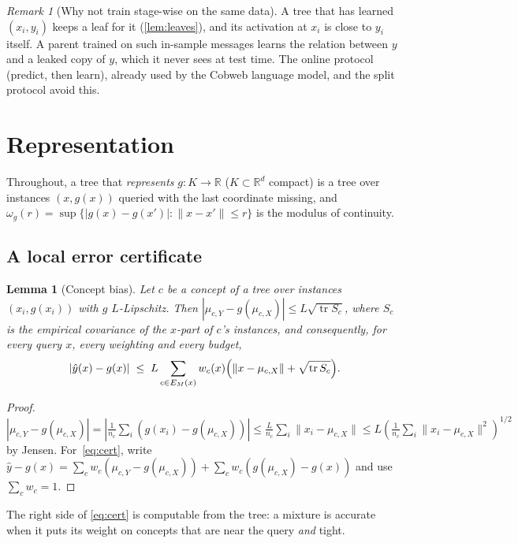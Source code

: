 \documentclass[11pt]{article}
\newtheorem{lemma}[theorem]{Lemma}
\theoremstyle{definition}
\theoremstyle{remark}
\newtheorem{remark}[theorem]{Remark}
\newcommand{\R}{\mathbb{R}}
\newcommand{\hy}{\hat{y}}
\newcommand{\tr}{\operatorname{tr}}
\begin{document}
\begin{remark}[Why not train stage-wise on the same data]
A tree that has learned $(x_i,y_i)$ keeps a leaf for it (\cref{lem:leaves}), and its
activation at $x_i$ is close to $y_i$ itself.  A parent trained on such in-sample
messages learns the relation between $y$ and a leaked copy of $y$, which it never sees at
test time.  The online protocol (predict, then learn), already used by the Cobweb
language model, and the split protocol avoid this.
\end{remark}

\section{Representation}\label{sec:repr}

Throughout, a tree that \emph{represents} $g:K\to\R$ ($K\subset\R^d$ compact) is a tree
over instances $(x,g(x))$ queried with the last coordinate missing, and
$\omega_g(r)=\sup\{|g(x)-g(x')|:\|x-x'\|\le r\}$ is the modulus of continuity.

\subsection{A local error certificate}

\begin{lemma}[Concept bias]\label{lem:bias}
Let $c$ be a concept of a tree over instances $(x_i,g(x_i))$ with $g$ $L$-Lipschitz.
Then $|\mu_{c,Y}-g(\mu_{c,X})|\le L\sqrt{\tr S_c}$, where $S_c$ is the empirical
covariance of the $x$-part of $c$'s instances, and consequently, for every query $x$,
every weighting and every budget,
\begin{equation}\label{eq:cert}
  |\hy(x)-g(x)|\;\le\;L\sum_{c\in E_M(x)}w_c(x)\Bigl(\|x-\mu_{c,X}\|+\sqrt{\tr S_c}\Bigr).
\end{equation}
\end{lemma}
\begin{proof}
$|\mu_{c,Y}-g(\mu_{c,X})|=|\tfrac{1}{n_c}\sum_i(g(x_i)-g(\mu_{c,X}))|\le
\tfrac{L}{n_c}\sum_i\|x_i-\mu_{c,X}\|\le L(\tfrac1{n_c}\sum_i\|x_i-\mu_{c,X}\|^2)^{1/2}$
by Jensen.  For~\eqref{eq:cert}, write $\hy-g(x)=\sum_c w_c(\mu_{c,Y}-g(\mu_{c,X}))+
\sum_c w_c(g(\mu_{c,X})-g(x))$ and use $\sum_cw_c=1$.
\end{proof}

The right side of \eqref{eq:cert} is computable from the tree: a mixture is accurate
when it puts its weight on concepts that are near the query \emph{and} tight.
\end{document}

